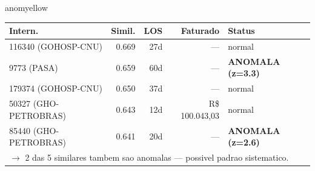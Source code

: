 \documentclass[a4paper,10pt]{article}
\begin{document}
\begin{anomalycard}[Internacao 167214 | GHO-PETROBRAS | MODERADO (z=2.66)]{anomyellow}
\begin{tabular}{l r r r l}\toprule\textbf{Intern.} & \textbf{Simil.} & \textbf{LOS} & \textbf{Faturado} & \textbf{Status} \\\midrule
116340 (GOHOSP-CNU) & 0.669 & 27d & --- & \textcolor{jcubeblue}{normal} \\
9773 (PASA) & 0.659 & 60d & --- & \textcolor{anomred}{\textbf{ANOMALA (z=3.3)}} \\
179374 (GOHOSP-CNU) & 0.650 & 37d & --- & \textcolor{jcubeblue}{normal} \\
50327 (GHO-PETROBRAS) & 0.643 & 12d & R\$ 100.043,03 & \textcolor{jcubeblue}{normal} \\
85440 (GHO-PETROBRAS) & 0.641 & 20d & --- & \textcolor{anomred}{\textbf{ANOMALA (z=2.6)}} \\
\multicolumn{5}{l}{\textcolor{anomred}{\small $\rightarrow$ 2 das 5 similares tambem sao anomalas --- possivel padrao sistematico.}} \\
\bottomrule\end{tabular}


\end{anomalycard}

\newpage
\end{document}

